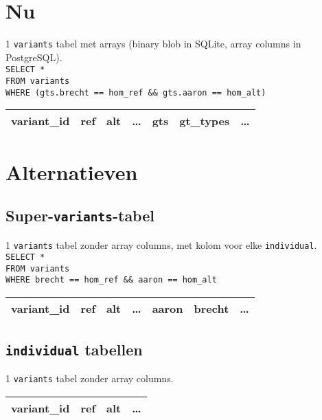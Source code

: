\documentclass{article}
\begin{document}
\section{Nu}

1 \texttt{variants} tabel met arrays (binary blob in SQLite, array columns in PostgreSQL).\\

\texttt{SELECT * \\FROM variants \\WHERE (gts.brecht == hom\_ref \&\& gts.aaron == hom\_alt)}
\begin{table}[h]
\begin{tabular}{@{}|l|l|l|l|l|l|l|@{}}
\toprule
variant\_id & ref & alt & \ldots & gts & gt\_types & \ldots \\ \bottomrule
\end{tabular}
\end{table}

\section{Alternatieven}

\subsection{Super-\texttt{variants}-tabel}

1 \texttt{variants} tabel zonder array columns, met kolom voor elke \texttt{individual}.\\

\texttt{SELECT * \\
FROM variants \\
WHERE brecht == hom\_ref \&\& aaron == hom\_alt}
\begin{table}[!htbp]
\begin{tabular}{@{}|l|l|l|l|l|l|l|@{}}
\toprule
variant\_id & ref & alt & \ldots & aaron & brecht & \ldots \\ \bottomrule
\end{tabular}
\end{table}

\subsection{\texttt{individual} tabellen} 

1 \texttt{variants} tabel zonder array columns.

\begin{table}[!htbp]
\begin{tabular}{@{}|l|l|l|l|@{}}
\toprule
variant\_id & ref & alt & \ldots \\ \bottomrule
\end{tabular}
\end{table}
\end{document}
